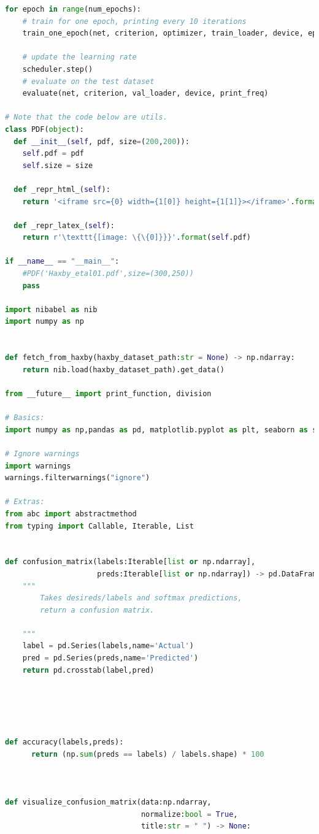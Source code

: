 \documentclass[10pt, twocolumn, letterpaper]{article}
\begin{document}
\begin{lstlisting}[language=Python]
for epoch in range(num_epochs):
    # train for one epoch, printing every 10 iterations
    train_one_epoch(net, criterion, optimizer, train_loader, device, epoch, print_freq, apex=False)
    
    # update the learning rate
    scheduler.step()
    # evaluate on the test dataset
    evaluate(net, criterion, val_loader, device, print_freq)

# Note that the code below are utils.
class PDF(object):
  def __init__(self, pdf, size=(200,200)):
    self.pdf = pdf
    self.size = size

  def _repr_html_(self):
    return '<iframe src={0} width={1[0]} height={1[1]}></iframe>'.format(self.pdf, self.size)

  def _repr_latex_(self):
    return r'\texttt{[image: \{\{0]}}}'.format(self.pdf)

if __name__ == "__main__":
    #PDF('Haxby_etal01.pdf',size=(300,250))
    pass
    
import nibabel as nib
import numpy as np

  
def fetch_from_haxby(haxby_dataset_path:str = None) -> np.ndarray:
    return nib.load(haxby_dataset_path).get_data()
    
from __future__ import print_function, division

# Basics:
import numpy as np,pandas as pd, matplotlib.pyplot as plt, seaborn as sns

# Ignore warnings
import warnings
warnings.filterwarnings("ignore")

# Extras:
from abc import abstractmethod
from typing import Callable, Iterable, List


def confusion_matrix(labels:Iterable[list or np.ndarray],
                     preds:Iterable[list or np.ndarray]) -> pd.DataFrame:
    """
        Takes desireds/labels and softmax predictions,
        return a confusion matrix.
        
    """
    label = pd.Series(labels,name='Actual')
    pred = pd.Series(preds,name='Predicted')
    return pd.crosstab(label,pred)





def accuracy(labels,preds):
      return (np.sum(preds == labels) / labels.shape) * 100

    

def visualize_confusion_matrix(data:np.ndarray,
                               normalize:bool = True,
                               title:str = " ") -> None:
    

\end{lstlisting}
\end{document}
